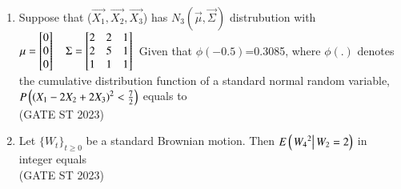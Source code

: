 \begin{enumerate}[label=\thechapter.\arabic*,ref=\thechapter.\theenumi]
\item Suppose that ($\vec{X_1},\vec{X_2},\vec{X_3}$) has $N_3(\vec{\mu},\vec{\Sigma})$ distrubution with 
$\mu = \begin{bmatrix}
0 \\
0\\
0
\end{bmatrix} \quad  
\Sigma=\begin{bmatrix}
2 & 2 & 1 \\
2 & 5 & 1 \\
1 & 1 & 1
\end{bmatrix} \\ $ Given that $\phi(-0.5)$=0.3085, where $\phi(.)$ denotes the cumulative distribution function of a standard normal random variable, $P \left( \left(X_1-2X_2+2X_3\right)^2 < \frac{7}{2} \right)$ equals to \\
\hfill(GATE ST 2023)
\\

\item Let $\{W_t\}_{t \geq 0}$ be a standard Brownian motion. Then $E\left(\left.{W_4}^2\right | W_2=2\right)$ in integer equals\\
\hfill(GATE ST 2023)
\\

\end{enumerate}
